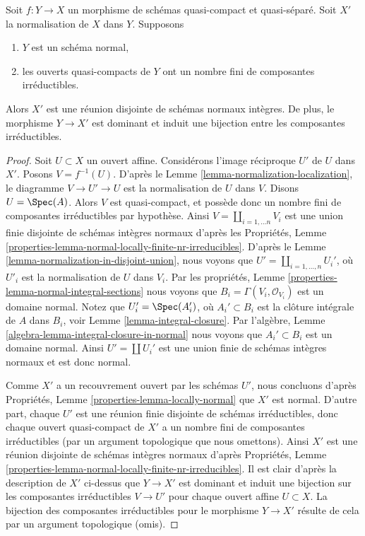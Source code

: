 \begin{lemma}
\label{lemma-normal-normalization}
Soit $f : Y \to X$ un morphisme de schémas quasi-compact et quasi-séparé. Soit
$X'$ la normalisation de $X$ dans $Y$. Supposons
\begin{enumerate}
\item $Y$ est un schéma normal,
\item les ouverts quasi-compacts de $Y$ ont un nombre fini de composantes irréductibles.
\end{enumerate}
Alors $X'$ est une réunion disjointe de schémas normaux intègres. De plus,
le morphisme $Y \to X'$ est dominant et induit une bijection entre les
composantes irréductibles.
\end{lemma}

\begin{proof}
Soit $U \subset X$ un ouvert affine. Considérons
l'image réciproque $U'$ de
$U$ dans $X'$. Posons $V = f^{-1}(U)$. D'après le Lemme
\ref{lemma-normalization-localization}, le diagramme $V \to U' \to U$ est la normalisation de
$U$ dans $V$. Disons $U = \Spec(A)$. Alors $V$ est
quasi-compact, et possède donc un nombre
fini de composantes irréductibles par hypothèse. Ainsi $V = \coprod_{i = 1, \ldots n} V_i$
est une union
finie disjointe de schémas intègres normaux d'après les Propriétés, Lemme
\ref{properties-lemma-normal-locally-finite-nr-irreducibles}. D'après le Lemme \ref{lemma-normalization-in-disjoint-union}, nous
voyons que $U' = \coprod_{i = 1, \ldots, n} U_i'$, où $U'_i$ est la
normalisation de $U$ dans $V_i$.
Par les propriétés, Lemme \ref{properties-lemma-normal-integral-sections} nous voyons que
$B_i = \Gamma(V_i, \mathcal{O}_{V_i})$ est un domaine normal. Notez que $U_i' = \Spec(A_i')$,
où $A_i' \subset B_i$ est la clôture intégrale de
$A$ dans $B_i$, voir
Lemme \ref{lemma-integral-closure}. Par l'algèbre,
Lemme \ref{algebra-lemma-integral-closure-in-normal} nous voyons que $A_i' \subset B_i$
est un domaine normal. Ainsi $U' = \coprod U_i'$
est une union finie de schémas intègres normaux et est
donc normal.

\medskip\noindent
Comme $X'$ a un recouvrement ouvert par les schémas $U'$,
nous concluons d'après Propriétés, Lemme \ref{properties-lemma-locally-normal} que $X'$ est normal. D'autre
part, chaque $U'$ est une réunion finie disjointe de schémas
irréductibles, donc chaque ouvert quasi-compact de $X'$ a un nombre fini de
composantes irréductibles (par un argument topologique que nous omettons).
Ainsi $X'$ est une réunion disjointe
de schémas intègres normaux d'après Propriétés, Lemme \ref{properties-lemma-normal-locally-finite-nr-irreducibles}. Il est clair d'après
la description de $X'$ ci-dessus que $Y \to X'$ est dominant
et induit une bijection sur les composantes irréductibles $V \to U'$
pour chaque ouvert affine $U \subset X$. La bijection des composantes
irréductibles pour le morphisme $Y \to X'$
résulte de cela par un argument topologique (omis).
\end{proof}

